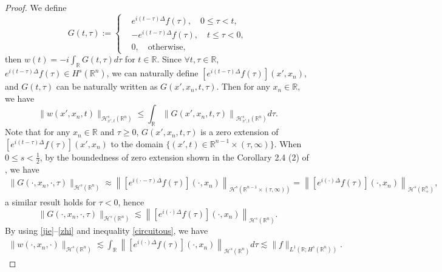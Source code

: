 \documentclass[preprint,compress,12pt]{elsarticle}
\numberwithin{equation}{section}
\begin{document}
\begin{proof}
	We define
	\begin{equation*}
		G(t,\tau):=\left\{\begin{aligned}&e^{i(t-\tau)\Delta}f(\tau), \quad 0\leq\tau<t, \\
			&-e^{i(t-\tau)\Delta}f(\tau),\quad t\leq\tau<0,  \\
			&0,\quad \text{otherwise},
		\end{aligned}\right.
	\end{equation*}	
	then $w(t)=-i\int_{\mathbb{R}}G(t,\tau)d\tau$ for $t\in \mathbb{R}$. Since $\forall t, \tau\in\mathbb{R}$, $e^{i(t-\tau)\Delta}f(\tau)\in H^{s}(\mathbb{R}^{n})$, we can naturally define $\left[e^{i(t-\tau)\Delta}f(\tau)\right](x',x_{n})$, and $G(t,\tau)$ can be naturally written as $G(x',x_{n},t,\tau)$. Then for any $x_{n}\in\mathbb{R}$, we have
	\begin{equation}\label{jie}			\|w(x',x_{n},t)\|_{\mathcal{H}_{x',t}^{s}(\mathbb{R}^{n})}\leq \int_{\mathbb{R}}\left\|G(x',x_{n},t,\tau)\right\|_{\mathcal{H}_{x',t}^{s}\left(\mathbb{R}^{n}\right)}d\tau.
	\end{equation}
	Note that for any $x_{n}\in \mathbb{R}$ and $\tau\geq0$, $G(x',x_{n},t,\tau)$ is a zero extension of $[e^{i(t-\tau)\Delta}f(\tau)](x',x_{n})$ to the domain $\{(x',t)\in \mathbb{R}^{n-1}\times(\tau,\infty)\}$. When $0\leq s<\frac{1}{2}$, by the boundedness of zero extension shown in the Corollary 2.4 (2) of \cite{facilitate}, we have
	\begin{equation*}
		\begin{aligned}		\|G(\cdot,x_{n},\cdot,\tau)\|_{\mathcal{H}^{s}(\mathbb{R}^{n})}\approx		\left\|\left[e^{i(\cdot-\tau)\Delta}f(\tau)\right](\cdot,x_{n})\right\|_{\mathcal{H}^{s}(\mathbb{R}^{n-1}\times(\tau,\infty))}=\left\|\left[e^{i(\cdot)\Delta}f(\tau)\right](\cdot,x_{n})\right\|_{\mathcal{H}^{s}(\mathbb{R}^{n}_{+})},
		\end{aligned}
	\end{equation*}
	a similar result holds for $\tau<0$, hence
	\begin{equation}\label{zhi}
		\|G(\cdot,x_{n},\cdot,\tau)\|_{\mathcal{H}^{s}(\mathbb{R}^{n})}\lesssim \left\|\left[e^{i(\cdot)\Delta} f(\tau)\right](\cdot,x_{n})\right\|_{\mathcal{H}^{s}(\mathbb{R}^{n})}.
	\end{equation}
	By using \eqref{jie}--\eqref{zhi} and inequality \eqref{circuitous}, we have
	\begin{equation}\label{xx}
		\begin{aligned}			\|w(\cdot,x_{n},\cdot)\|_{\mathcal{H}^{s}(\mathbb{R}^{n})}\lesssim\int_{\mathbb{R}}\left\|\left[e^{i(\cdot)\Delta}f(\tau)\right](\cdot,x_{n})\right\|_{\mathcal{H}^{s}(\mathbb{R}^{n})}d\tau			\lesssim\|f\|_{L^{1}(\mathbb{R};H^{s}(\mathbb{R}^{n}))}.
		\end{aligned}
	\end{equation}
\end{proof}
\end{document}
